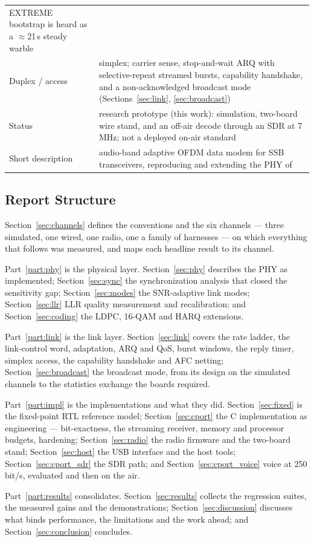 \begin{table}[H]
\begin{tabular}{@{}lp{9.2cm}@{}}
                        EXTREME bootstrap is heard as a
                        $\approx$21\,s steady warble \\
    Duplex / access   & simplex; carrier sense, stop-and-wait ARQ with
                        selective-repeat streamed bursts, capability
                        handshake, and a non-acknowledged broadcast
                        mode (Sections~\ref{sec:link},
                        \ref{sec:broadcast}) \\
    Status            & research prototype (this work): simulation,
                        two-board wire stand, and an off-air decode
                        through an SDR at 7\,MHz; not a deployed
                        on-air standard \\
    Short description & audio-band adaptive OFDM data modem for SSB
                        transceivers, reproducing and extending the
                        PHY of~\cite{habr_ofdm} \\
    \bottomrule
    \end{tabular}
\end{table}

\subsection{Report Structure}

Section~\ref{sec:channels} defines the conventions and the six
channels --- three simulated, one wired, one radio, one a family of
harnesses --- on which everything that follows was measured, and maps
each headline result to its channel.

Part~\ref{part:phy} is the physical layer.
Section~\ref{sec:phy} describes the PHY as implemented;
Section~\ref{sec:sync} the synchronization analysis that closed the
sensitivity gap; Section~\ref{sec:modes} the SNR-adaptive link modes;
Section~\ref{sec:llr} LLR quality measurement and recalibration; and
Section~\ref{sec:coding} the LDPC, 16-QAM and HARQ extensions.

Part~\ref{part:link} is the link layer.  Section~\ref{sec:link}
covers the rate ladder, the link-control word, adaptation, ARQ and
QoS, burst windows, the reply timer, simplex access, the capability
handshake and AFC netting; Section~\ref{sec:broadcast} the broadcast
mode, from its design on the simulated channels to the statistics
exchange the boards required.

Part~\ref{part:impl} is the implementations and what they did.
Section~\ref{sec:fixed} is the fixed-point RTL reference model;
Section~\ref{sec:cport} the C implementation as engineering ---
bit-exactness, the streaming receiver, memory and processor budgets,
hardening; Section~\ref{sec:radio} the radio firmware and the
two-board stand; Section~\ref{sec:host} the USB interface and the host
tools; Section~\ref{sec:cport_sdr} the SDR path; and
Section~\ref{sec:cport_voice} voice at 250\,bit/s, evaluated and then
on the air.

Part~\ref{part:results} consolidates.  Section~\ref{sec:results}
collects the regression suites, the measured gains and the
demonstrations; Section~\ref{sec:discussion} discusses what binds
performance, the limitations and the work ahead; and
Section~\ref{sec:conclusion} concludes.
